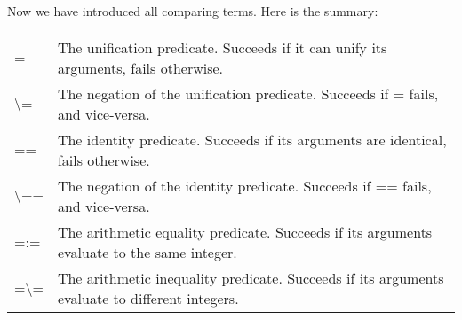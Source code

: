 

\begin{frame}
	\frametitle{\insertsection}
	
	Now we have introduced all comparing terms. Here is the summary:
	
	\begin{table}
		\centering
		\begin{tabular}{l m{10cm}}
			\rowcolor{LightGray} = & The unification predicate. Succeeds if it can unify its arguments, fails otherwise.\\
			\rowcolor{LightGray} \textbackslash= & The negation of the unification predicate. Succeeds if = fails, and vice-versa.\\
			\rowcolor{LightGray} == & The identity predicate. Succeeds if its arguments are identical, fails otherwise.\\
			\rowcolor{LightGray} \textbackslash== & The negation of the identity predicate. Succeeds if == fails, and vice-versa.\\
			\rowcolor{LightGray} =:= & The arithmetic equality predicate. Succeeds if its arguments evaluate to the same integer.\\
			\rowcolor{LightGray} =\textbackslash= & The arithmetic inequality predicate. Succeeds if its arguments evaluate to different integers.
		\end{tabular}
	\end{table}
\end{frame}


